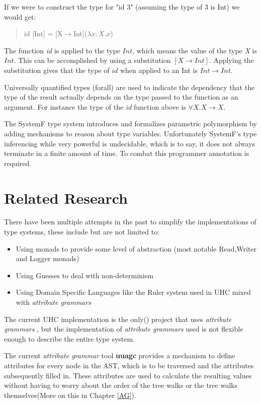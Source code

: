 \documentclass[twoside, titlepage, openright, a4paper]{book}
\newcommand{\Conid}[1]{\mathit{#1}}
\newcommand{\Varid}[1]{\mathit{#1}}
\newcommand{\ba}[1]{$[#1]$}
\newcommand{\ag}{\emph{attribute grammar }}
\newcommand{\ags}{\emph{attribute grammars }}
\begin{document}
If we were to construct the type for "id 3" (assuming the type of 3 is Int) we would get:

\begin{quotation}
id [Int] = [X$\rightarrow$Int]($\lambda x:X. x$)
\end{quotation}

The function \emph{id} is applied to the type \ensuremath{\Conid{Int}}, which means the value of the type \emph{X} is \ensuremath{\Conid{Int}}. This can be accomplished by using a substitution \ba{X\rightarrow Int}. Applying the substitution gives that the type of \ensuremath{\Varid{id}} when applied to an Int is $Int \rightarrow Int$.

Universally quantified types (forall) are used to indicate the dependency that the type of the result actually depends on the type passed to the function as an argument. For instance the type of the \textit{id} function above is $\forall X. X\rightarrow X$.

The SystemF type system introduces and formalizes parametric polymorphism by adding mechanisms to reason about type variables. Unfortunately SystemF's type inferencing while very powerful is undecidable, which is to say, it does not always terminate in a finite amount of time. To combat this programmer annotation is required.

\section{Related Research}
There have been multiple attempts in the past to simplify the implementations of type systems, these include but are not limited to:

\begin{itemize}
\item Using monads\cite{Monads} to provide some level of abstraction (most notable Read,Writer and Logger monads)
\item Using Guesses\cite{Guesses} to deal with non-determinism 
\item Using Domain Specific Languages like the Ruler\cite{Ruler} system used in UHC mixed with \ags
\end{itemize}

The current UHC implementation is the only(\cite{UHC}) project that uses \ags, but the implementation of \ags used is not flexible enough to describe the entire type system.

The current \ag tool \textbf{uuagc} provides a mechanism to define attributes for every node in the AST, which is to be traversed and the attributes subsequently filled in. These attributes are used to calculate the resulting values without having to worry about the order of the tree walks or the tree walks themselves(More on this in Chapter \ref{AG}).
\end{document}
